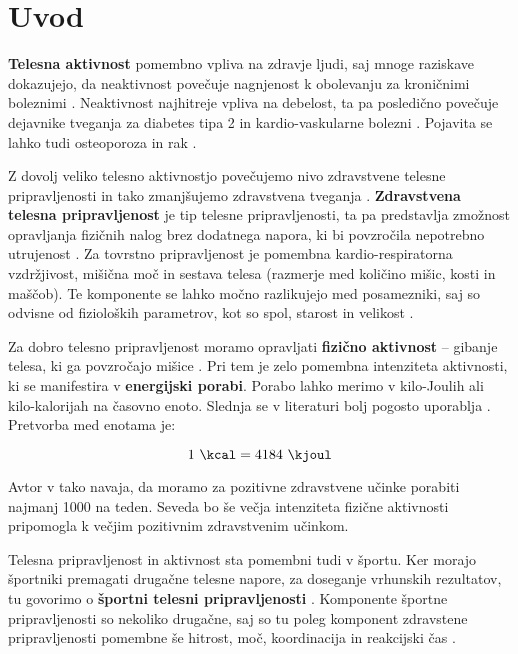 \chapter{Uvod} \label{uvod}
\textbf{Telesna aktivnost} pomembno vpliva na zdravje ljudi, saj mnoge raziskave dokazujejo, da neaktivnost povečuje nagnjenost k obolevanju za kroničnimi boleznimi \cite{warburton2006health}. Neaktivnost najhitreje vpliva na debelost, ta pa posledično povečuje dejavnike tveganja za diabetes tipa 2 in kardio-vaskularne bolezni \cite{bassuk2005epidemiological}. Pojavita se lahko tudi osteoporoza in rak \cite{warburton2006health}. 

Z dovolj veliko telesno aktivnostjo povečujemo nivo zdravstvene telesne pripravljenosti in tako zmanjšujemo zdravstvena tveganja \cite{caspersen1985physical}. \textbf{Zdravstvena telesna pripravljenost} je tip telesne pripravljenosti, ta pa predstavlja zmožnost opravljanja fizičnih nalog brez dodatnega napora, ki bi povzročila nepotrebno utrujenost \cite{caspersen1985physical}. Za tovrstno pripravljenost je pomembna kardio-respiratorna vzdržjivost, mišična moč in sestava telesa (razmerje med količino mišic, kosti in maščob). Te komponente se lahko močno razlikujejo med posamezniki, saj so odvisne od fizioloških parametrov, kot so spol, starost in velikost \cite{caspersen1985physical}.

Za dobro telesno pripravljenost moramo opravljati \textbf{fizično aktivnost} -- gibanje telesa, ki ga povzročajo mišice \cite{caspersen1985physical}. Pri tem je zelo pomembna intenziteta aktivnosti, ki se manifestira v \textbf{energijski porabi}. Porabo lahko merimo v kilo-Joulih ali kilo-kalorijah na časovno enoto. Slednja se v literaturi bolj pogosto uporablja \cite{caspersen1985physical}. Pretvorba med enotama je: 

\begin{equation} \label{eq:pretvorba}
	1~\mathrm{\si{\kcal}} = 4184~\mathrm{\si{\kjoul}}
\end{equation}


Avtor v \cite{warburton2006health} tako navaja, da moramo za pozitivne zdravstvene učinke porabiti najmanj \SI{1000}{\kcal} na teden. Seveda bo še večja intenziteta fizične aktivnosti pripomogla k večjim pozitivnim zdravstvenim učinkom.

Telesna pripravljenost in aktivnost sta pomembni tudi v športu. Ker morajo športniki premagati drugačne telesne napore, za doseganje vrhunskih rezultatov, tu govorimo o \textbf{športni telesni pripravljenosti} \cite{caspersen1985physical}. Komponente športne pripravljenosti so nekoliko drugačne, saj so tu poleg komponent zdravstene pripravljenosti pomembne še hitrost, moč, koordinacija in reakcijski čas \cite{caspersen1985physical}.

